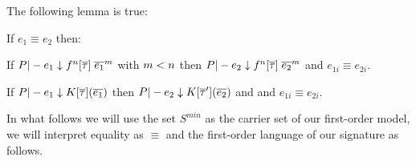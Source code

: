 The following lemma is true:
\begin{lemma}\label{lem:equiv-shapes} If $e_1 \equiv e_2$ then:
\begin{itemize*}
  \item If $P |- e_1 \downarrow f^n[\overline{\tau}]\;\overline{e_1}^{m}$ with $m < n$ then $P |- e_2 \downarrow f^n[\overline{\tau}]\;\overline{e_2}^{m}$ and $e_{1i} \equiv e_{2i}$.
  \item If $P |- e_1 \downarrow K[\overline{\tau}](\overline{e_1})$ then $P |- e_2 \downarrow K[\overline{\tau}'](\overline{e_2})$ and and $e_{1i} \equiv e_{2i}$.
\end{itemize*}
\end{lemma}
In what follows we will use the set $S^{min}$ as the carrier set of our first-order model, we will 
interpret equality as $\equiv$ and the first-order language of our signature as follows.


